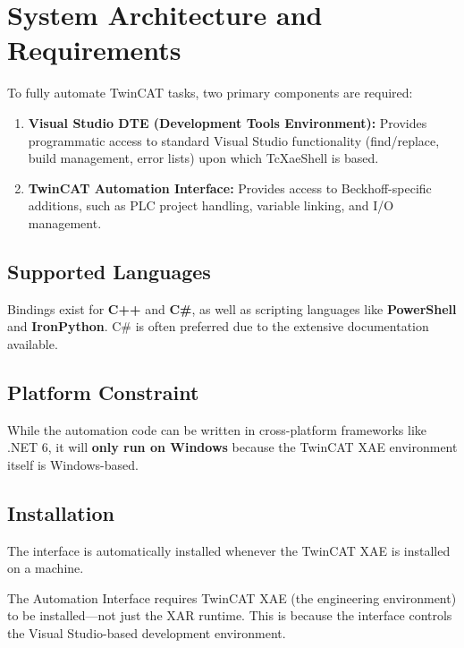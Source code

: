 \documentclass[11pt,a4paper]{article}
\begin{document}
\section{System Architecture and Requirements}

To fully automate TwinCAT tasks, two primary components are required:

\begin{enumerate}[leftmargin=*]
    \item \textbf{Visual Studio DTE (Development Tools Environment):} Provides programmatic access to standard Visual Studio functionality (find/replace, build management, error lists) upon which TcXaeShell is based.
    
    \item \textbf{TwinCAT Automation Interface:} Provides access to Beckhoff-specific additions, such as PLC project handling, variable linking, and I/O management.
\end{enumerate}

\subsection{Supported Languages}

Bindings exist for \textbf{C++} and \textbf{C\#}, as well as scripting languages like \textbf{PowerShell} and \textbf{IronPython}. C\# is often preferred due to the extensive documentation available.

\subsection{Platform Constraint}

While the automation code can be written in cross-platform frameworks like .NET 6, it will \textbf{only run on Windows} because the TwinCAT XAE environment itself is Windows-based.

\subsection{Installation}

The interface is automatically installed whenever the TwinCAT XAE is installed on a machine.

\begin{notebox}
The Automation Interface requires TwinCAT XAE (the engineering environment) to be installed---not just the XAR runtime. This is because the interface controls the Visual Studio-based development environment.
\end{notebox}
\end{document}
